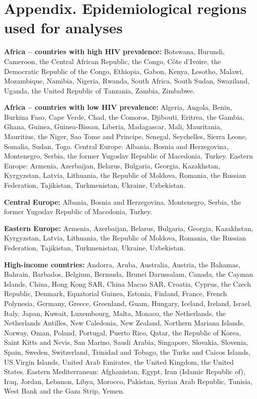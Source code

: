 \section*{Appendix. Epidemiological regions used for analyses}

\textbf{Africa – countries with high HIV prevalence:} Botswana, Burundi, Cameroon, the Central African Republic, the Congo, Côte d’Ivoire, the Democratic Republic of the Congo, Ethiopia, Gabon, Kenya, Lesotho, Malawi, Mozambique, Namibia, Nigeria, Rwanda, South Africa, South Sudan, Swaziland, Uganda, the United Republic of Tanzania, Zambia, Zimbabwe. 

\textbf{Africa – countries with low HIV prevalence:} Algeria, Angola, Benin, Burkina Faso, Cape Verde, Chad, the Comoros, Djibouti, Eritrea, the Gambia, Ghana, Guinea, Guinea-Bissau, Liberia, Madagascar, Mali, Mauritania, Mauritius, the Niger, Sao Tome and Principe, Senegal, Seychelles, Sierra Leone, Somalia, Sudan, Togo.
Central Europe: Albania, Bosnia and Herzegovina, Montenegro, Serbia, the former Yugoslav Republic of Macedonia, Turkey.
Eastern Europe: Armenia, Azerbaijan, Belarus, Bulgaria, Georgia, Kazakhstan, Kyrgyzstan, Latvia, Lithuania, the Republic of Moldova, Romania, the Russian Federation, Tajikistan, Turkmenistan, Ukraine, Uzbekistan.

\textbf{Central Europe:} Albania, Bosnia and Herzegovina, Montenegro, Serbia, the former Yugoslav Republic of Macedonia, Turkey.

\textbf{Eastern Europe:} Armenia, Azerbaijan, Belarus, Bulgaria, Georgia, Kazakhstan, Kyrgyzstan, Latvia, Lithuania, the Republic of Moldova, Romania, the Russian Federation, Tajikistan, Turkmenistan, Ukraine, Uzbekistan.

\textbf{High-income countries:} Andorra, Aruba, Australia, Austria, the Bahamas, Bahrain, Barbados, Belgium, Bermuda, Brunei Darussalam, Canada, the Cayman Islands, China, Hong Kong SAR, China Macao SAR, Croatia, Cyprus, the Czech Republic, Denmark, Equatorial Guinea, Estonia, Finland, France, French Polynesia, Germany, Greece, Greenland, Guam, Hungary, Iceland, Ireland, Israel, Italy, Japan, Kuwait, Luxembourg, Malta, Monaco, the Netherlands, the Netherlands Antilles, New Caledonia, New Zealand, Northern Mariana Islands, Norway, Oman, Poland, Portugal, Puerto Rico, Qatar, the Republic of Korea, Saint Kitts and Nevis, San Marino, Saudi Arabia, Singapore, Slovakia, Slovenia, Spain, Sweden, Switzerland, Trinidad and Tobago, the Turks and Caicos Islands, US Virgin Islands, United Arab Emirates, the United Kingdom, the United States.
Eastern Mediterranean: Afghanistan, Egypt, Iran (Islamic Republic of), Iraq, Jordan, Lebanon, Libya, Morocco, Pakistan, Syrian Arab Republic, Tunisia, West Bank and the Gaza Strip, Yemen. 

